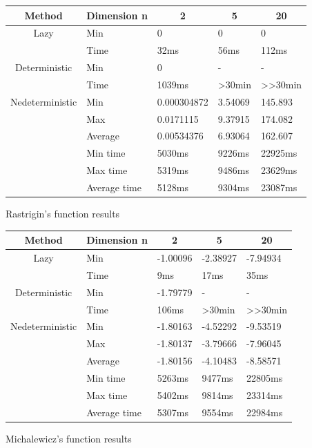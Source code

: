 \documentclass{article}
\begin{document}
\begin{figure}[!h]
\begin{tabular}{|c|l|l|l|l|}
\hline
Method & \multicolumn{1}{c|}{Dimension n} & \multicolumn{1}{c|}{2} & \multicolumn{1}{c|}{5} & \multicolumn{1}{c|}{20} \\ \hline
\multirow{2}{*}{Lazy} & Min & 0 & 0 & 0 \\ \cline{2-5} 
 & Time & 32ms & 56ms & 112ms \\ \hline
\multirow{2}{*}{Deterministic} & Min & 0 & - & - \\ \cline{2-5} 
 & Time & 1039ms & \textgreater{}30min & \textgreater{}\textgreater{}30min \\ \hline
\multirow{6}{*}{Nedeterministic} & Min & 0.000304872 & 3.54069 & 145.893 \\ \cline{2-5} 
 & Max & 0.0171115 & 9.37915 & 174.082 \\ \cline{2-5} 
 & Average & 0.00534376 & 6.93064 & 162.607 \\ \cline{2-5} 
 & Min time & 5030ms & 9226ms & 22925ms \\ \cline{2-5} 
 & Max time & 5319ms & 9486ms & 23629ms \\ \cline{2-5} 
 & Average time & 5128ms & 9304ms & 23087ms \\ \hline
\end{tabular}
\caption{Rastrigin's function results}
\end{figure}

\begin{figure}[!h]
\begin{tabular}{|c|l|l|l|l|}
\hline
Method & \multicolumn{1}{c|}{Dimension n} & \multicolumn{1}{c|}{2} & \multicolumn{1}{c|}{5} & \multicolumn{1}{c|}{20} \\ \hline
\multirow{2}{*}{Lazy} & Min & -1.00096 & -2.38927 & -7.94934 \\ \cline{2-5} 
 & Time & 9ms & 17ms & 35ms \\ \hline
\multirow{2}{*}{Deterministic} & Min & -1.79779 & - & - \\ \cline{2-5} 
 & Time & 106ms & \textgreater{}30min & \textgreater{}\textgreater{}30min \\ \hline
\multirow{6}{*}{Nedeterministic} & Min & -1.80163 & -4.52292 & -9.53519 \\ \cline{2-5} 
 & Max & -1.80137 & -3.79666 & -7.96045 \\ \cline{2-5} 
 & Average & -1.80156 & -4.10483 & -8.58571 \\ \cline{2-5} 
 & Min time & 5263ms & 9477ms & 22805ms \\ \cline{2-5} 
 & Max time & 5402ms & 9814ms & 23314ms \\ \cline{2-5} 
 & Average time & 5307ms & 9554ms & 22984ms \\ \hline
\end{tabular}
\caption{Michalewicz's function results}
\end{figure}
\end{document}
